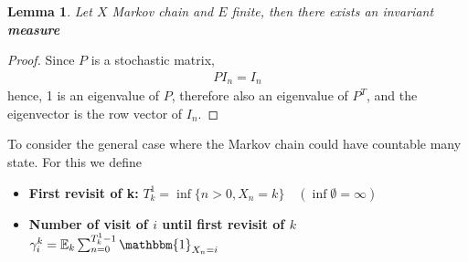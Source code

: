 \documentclass[a4paper,11pt]{book}
\newtheorem{lemma}[theorem]{Lemma}
\theoremstyle{definition}
\theoremstyle{remark}
\begin{document}
\begin{lemma}
	Let $X$ Markov chain and $E$ finite, then there exists an invariant \textbf{measure}
\end{lemma}
\begin{proof}
	Since $P$ is a stochastic matrix, 
	\begin{align*}
		PI_n = I_n
	\end{align*}
	hence, 1 is an eigenvalue of $P$, therefore also an eigenvalue of $P^T$, and the eigenvector is the row vector of $I_n$.
\end{proof}

To consider the general case where the Markov chain could have countable many state. For this we define
\begin{itemize}
	\item \textbf{First revisit of k:}
	$T^1_k = \inf\{n > 0, X_n = k\} \quad (\inf \emptyset = \infty)$
	\item \textbf{Number of visit of $i$ until first revisit of $k$} $\gamma_i^k = \mathbb{E}_k \sum_{n = 0}^{T_k^1 -1} \mathbbm{1}_{X_n = i}$
\end{itemize}
\end{document}
